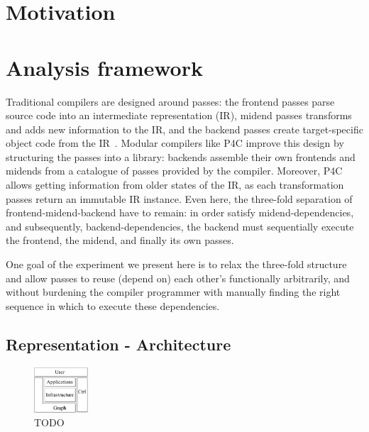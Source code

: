 \documentclass[sigconf]{acmart}
\begin{document}
	\section{Motivation}
	


\clearpage

	\section{Analysis framework}


Traditional compilers are designed around passes: the frontend passes parse source code into an intermediate representation (IR), midend passes transforms and adds new information to the IR, and the backend passes create target-specific object code from the IR~\cite{trad-compilers}.  
Modular compilers like P4C improve this design by structuring the passes into a library: backends assemble their own frontends and midends from a catalogue of passes provided by the compiler. Moreover, P4C allows getting information from older states of the IR, as each transformation passes return an immutable IR instance.
Even here, the three-fold separation of frontend-midend-backend have to remain: in order satisfy midend-dependencies, and subsequently, backend-dependencies, the backend must sequentially execute the frontend, the midend, and finally its own passes. 

One goal of the experiment we present here is to relax the three-fold structure and allow passes to reuse (depend on) each other's functionally arbitrarily, and without burdening the compiler programmer with manually finding the right sequence in which to execute these dependencies.

	\subsection{Representation - Architecture} %

  \begin{figure}
    \includegraphics[width=0.18\textwidth]{figures/arch-top.pdf}
    \caption{TODO}\label{fig:arch-top}
  \end{figure}
\end{document}
